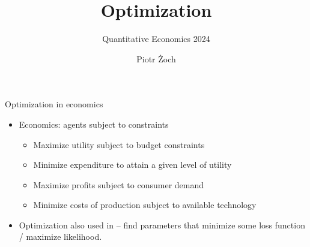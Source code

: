 \documentclass[11pt,xcolor={dvipsnames},aspectratio=159,hyperref={pdftex,pdfpagemode=UseNone,hidelinks,pdfdisplaydoctitle=true},usepdftitle=false]{beamer}
\begin{document}
\title{Optimization}
\subtitle{Quantitative Economics 2024}

\author{Piotr Żoch}%
\frame{\titlepage}

\begin{frame}{Optimization in economics}   
\begin{itemize}
    \item Economics: agents  subject to constraints
\begin{itemize}
    \item Maximize utility subject to budget constraints
    \item Minimize expenditure to attain a given level of utility
    \item Maximize profits subject to consumer demand
    \item Minimize costs of production subject to available technology
\end{itemize}
\item Optimization also used in  -- find parameters that minimize some loss function / maximize likelihood.
\end{itemize}
\end{frame}
\end{document}
